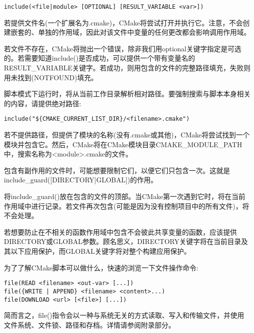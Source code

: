 \begin{lstlisting}[style=styleCMake]
include(<file|module> [OPTIONAL] [RESULT_VARIABLE <var>])
\end{lstlisting}

若提供文件名(一个扩展名为.cmake)，CMake将尝试打开并执行它。注意，不会创建嵌套的、单独的作用域，因此对该文件中变量的任何更改都会影响调用作用域。

若文件不存在，CMake将抛出一个错误，除非我们用optional关键字指定是可选的。若需要知道include()是否成功，可以提供一个带有变量名的RESULT\_VARIABLE关键字。若成功，则用包含的文件的完整路径填充，失败则用未找到(NOTFOUND)填充。

脚本模式下运行时，将从当前工作目录解析相对路径。要强制搜索与脚本本身相关的内容，请提供绝对路径:

\begin{lstlisting}[style=styleCMake]
include("${CMAKE_CURRENT_LIST_DIR}/<filename>.cmake")
\end{lstlisting}

若不提供路径，但提供了模块的名称(没有.cmake或其他)，CMake将尝试找到一个模块并包含它。然后，CMake将在CMake模块目录CMAKE\_MODULE\_PATH中，搜索名称为<module>.cmake的文件。


包含有副作用的文件时，可能想要限制它们，以便它们只包含一次。这就是include\_guard([DIRECTORY|GLOBAL])的作用。

将include\_guard()放在包含的文件的顶部。当CMake第一次遇到它时，将在当前作用域中进行记录。若文件再次包含(可能是因为没有控制项目中的所有文件)，将不会处理。

若想要防止在不相关的函数作用域中包含不会彼此共享变量的函数，应该提供DIRECTORY或GLOBAL参数。顾名思义，DIRECTORY关键字将在当前目录及其以下应用保护，而GLOBAL关键字将对整个构建应用保护。


为了了解CMake脚本可以做什么，快速的浏览一下文件操作命令:

\begin{lstlisting}[style=styleCMake]
file(READ <filename> <out-var> [...])
file({WRITE | APPEND} <filename> <content>...)
file(DOWNLOAD <url> [<file>] [...])
\end{lstlisting}

简而言之，file()指令会以一种与系统无关的方式读取、写入和传输文件，并使用文件系统、文件锁、路径和存档。详情请参阅附录部分。

